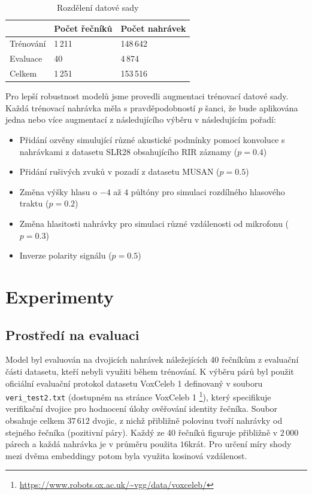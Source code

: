 \documentclass{article}
\begin{document}
\begin{table}[h!]
\centering
\begin{tabular}{|l|l|l|}
\hline
          & Počet řečníků & Počet nahrávek \\ \hline
Trénování & 1\,211        & 148\,642        \\ \hline
Evaluace  & 40            & 4\,874          \\ \hline
Celkem    & 1\,251        & 153\,516        \\ \hline
\end{tabular}
\caption{Rozdělení datové sady}
\label{split_stats}
\end{table}

Pro lepší robustnost modelů jsme provedli augmentaci trénovací datové sady. Každá trénovací nahrávka měla s pravděpodobností $p$ šanci, že bude aplikována jedna nebo více augmentací z následujícího výběru v následujícím pořadí:
\begin{itemize}
    \item Přidání ozvěny simulující různé akustické podmínky pomocí konvoluce s nahrávkami z datasetu SLR28 obsahujícího RIR záznamy \cite{rir} ($p=0.4$)
    \item Přidání rušivých zvuků v pozadí z datasetu MUSAN \cite{snyder2015musanmusicspeechnoise} ($p=0.5$)
    \item Změna výšky hlasu o $-4$ až $4$ půltóny pro simulaci rozdílného hlasového traktu ($p=0.2$)
    \item Změna hlasitosti nahrávky pro simulaci různé vzdálenosti od mikrofonu ($p=0.3$)
    \item Inverze polarity signálu ($p=0.5$)
\end{itemize}

\section{Experimenty} \label{exp}

\subsection{Prostředí na evaluaci}
Model byl evaluován na dvojicích nahrávek náležejících 40 řečníkům z evaluační části datasetu, kteří nebyli využiti během trénování. K výběru párů byl použit oficiální evaluační protokol datasetu VoxCeleb 1 definovaný v souboru \texttt{veri\_test2.txt} (dostupném na stránce VoxCeleb 1 \footnote{\href{https://www.robots.ox.ac.uk/~vgg/data/voxceleb/}{https://www.robots.ox.ac.uk/\textasciitilde vgg/data/voxceleb/}}), který specifikuje verifikační dvojice pro hodnocení úlohy ověřování identity řečníka. Soubor obsahuje celkem $37\,612$ dvojic, z nichž přibližně polovinu tvoří nahrávky od stejného řečníka (pozitivní páry). Každý ze 40 řečníků figuruje přibližně  v $2\,000$ párech a každá nahrávka je v průměru použita $16$krát. Pro určení míry shody mezi dvěma embeddingy potom byla využita kosinová vzdálenost.
\end{document}
